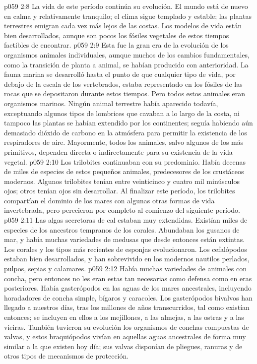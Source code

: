 \vs p059 2:8 La vida de este período continúa su evolución. El mundo está de nuevo en calma y relativamente tranquilo; el clima sigue templado y estable; las plantas terrestres emigran cada vez más lejos de las costas. Los modelos de vida están bien desarrollados, aunque son pocos los fósiles vegetales de estos tiempos factibles de encontrar.
\vs p059 2:9 \pc Esta fue la gran era de la evolución de los organismos animales individuales, aunque muchos de los cambios fundamentales, como la transición de planta a animal, se habían producido con anterioridad. La fauna marina se desarrolló hasta el punto de que cualquier tipo de vida, por debajo de la escala de los vertebrados, estaba representado en los fósiles de las rocas que se depositaron durante estos tiempos. Pero todos estos animales eran organismos marinos. Ningún animal terrestre había aparecido todavía, exceptuando algunos tipos de lombrices que cavaban a lo largo de la costa, ni tampoco las plantas se habían extendido por los continentes; seguía habiendo aún demasiado dióxido de carbono en la atmósfera para permitir la existencia de los respiradores de aire. Mayormente, todos los animales, salvo algunos de los más primitivos, dependen directa o indirectamente para su existencia de la vida vegetal.
\vs p059 2:10 Los trilobites continuaban con su predominio. Había decenas de miles de especies de estos pequeños animales, predecesores de los crustáceos modernos. Algunos trilobites tenían entre veinticinco y cuatro mil minúsculos ojos; otros tenían ojos sin desarrollar. Al finalizar este período, los trilobites compartían el dominio de los mares con algunas otras formas de vida invertebrada, pero perecieron por completo al comienzo del siguiente período.
\vs p059 2:11 Las algas secretoras de cal estaban muy extendidas. Existían miles de especies de los ancestros tempranos de los corales. Abundaban los gusanos de mar, y había muchas variedades de medusas que desde entonces están extintas. Los corales y los tipos más recientes de esponjas evolucionaron. Los cefalópodos estaban bien desarrollados, y han sobrevivido en los modernos nautilos perlados, pulpos, sepias y calamares.
\vs p059 2:12 Había muchas variedades de animales con concha, pero entonces no les eran estas tan necesarias como defensa como en eras posteriores. Había gasterópodos en las aguas de los mares ancestrales, incluyendo horadadores de concha simple, bígaros y caracoles. Los gasterópodos bivalvos han llegado a nuestros días, tras los millones de años transcurridos, tal como existían entonces; se incluyen en ellos a los mejillones, a las almejas, a las ostras y a las vieiras. También tuvieron su evolución los organismos de conchas compuestas de valvas, y estos braquiópodos vivían en aquellas aguas ancestrales de forma muy similar a la que existen hoy día; sus valvas disponían de pliegues, ranuras y de otros tipos de mecanismos de protección.
